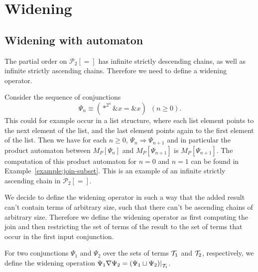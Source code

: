 \section{Widening}

\subsection{Widening with automaton}


The partial order on $\mathcal{P}_2[=]$ has infinite strictly descending chains, as well as
infinite strictly ascending chains. Therefore we need to define a widening operator.

\begin{example}
    Consider the sequence of conjunctions
    \[
        \Psi_n \equiv (*^{2^n} \&x = \&x)\hspace{6pt} (n\geq 0).
    \]
   This could for example occur in a list structure, where each list element points to the next element of the list, and the last element points again to the first element of the list.
   Then we have for each $n \geq 0$, $\Psi_n \Longrightarrow \Psi_{n+1}$ and in particular the product automaton between $M_P[\Psi_n]$ and $M_P[\Psi_{n+1}]$ is $M_P[\Psi_{n+1}]$.
   The computation of this product automaton for $n = 0$ and $n = 1$ can be found in Example~\ref{example:join-subset}. This is an example of an infinite strictly ascending chain in $\mathcal{P}_2[=]$.
\end{example}

We decide to define the widening operator in such a way that the added result can't contain terms of arbitrary size, such that there can't be ascending chains of arbitrary size. Therefore we define the widening operator as first computing the join and then restricting the set of terms of the result to the set of terms that occur in the first input conjunction.

\begin{definition}
    For two conjunctions $\Psi_1$ and $\Psi_2$ over the sets of terms $\mathcal{T}_1$ and $\mathcal{T}_2$, respectively, we define the widening operation
     $\Psi_1 \widen \Psi_2 = \restr{(\Psi_1 \join \Psi_2)}{\T_1}$.
\end{definition}

